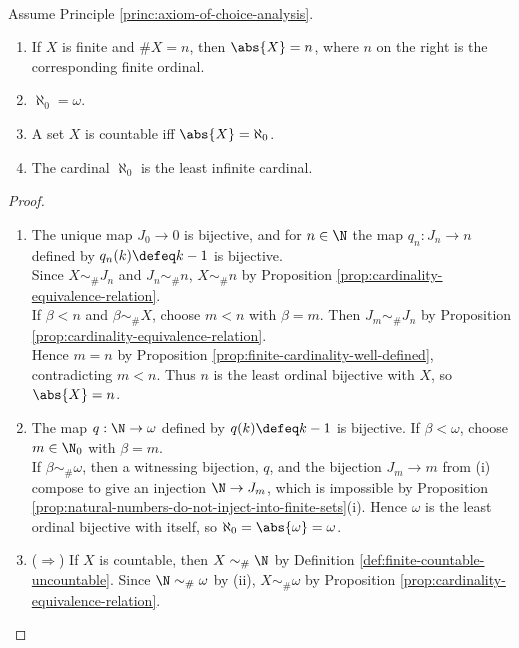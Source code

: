 \begin{proposition} \label{prop:finite-cardinality-and-aleph-zero-agreement} \\
Assume Principle \ref{princ:axiom-of-choice-analysis}.
\begin{enumerate}[label=(\roman*)]
\setlength{\itemsep}{0pt}
\item If $X$ is finite and $\#X=n$, then $\abs{X}=n$, where $n$ on the right is the corresponding finite ordinal.
\item $\aleph_0=\omega$.
\item A set $X$ is countable iff $\abs{X}=\aleph_0$.
\item The cardinal $\aleph_0$ is the least infinite cardinal.
\end{enumerate}
\begin{proof}
\begin{enumerate}[label=(\roman*)]
\setlength{\itemsep}{0pt}
\item[$(i)$] The unique map $J_0\to0$ is bijective, and for $n\in\N$ the map $q_n:J_n\to n$ defined by $q_n(k)\defeq k-1$ is bijective.\\
Since $X\sim_{\#}J_n$ and $J_n\sim_{\#}n$, $X\sim_{\#}n$ by Proposition \ref{prop:cardinality-equivalence-relation}.\\
If $\beta<n$ and $\beta\sim_{\#}X$, choose $m<n$ with $\beta=m$. Then $J_m\sim_{\#}J_n$ by Proposition \ref{prop:cardinality-equivalence-relation}.\\
Hence $m=n$ by Proposition \ref{prop:finite-cardinality-well-defined}, contradicting $m<n$. Thus $n$ is the least ordinal bijective with $X$, so $\abs{X}=n$.
\item[$(ii)$] The map $q:\N\to\omega$ defined by $q(k)\defeq k-1$ is bijective. If $\beta<\omega$, choose $m\in\N_0$ with $\beta=m$.\\
If $\beta\sim_{\#}\omega$, then a witnessing bijection, $q$, and the bijection $J_m\to m$ from (i) compose to give an injection $\N\to J_m$, which is impossible by Proposition \ref{prop:natural-numbers-do-not-inject-into-finite-sets}(i). Hence $\omega$ is the least ordinal bijective with itself, so $\aleph_0=\abs{\omega}=\omega$.
\item[$(iii)$] ($\Rightarrow$) If $X$ is countable, then $X\sim_{\#}\N$ by Definition \ref{def:finite-countable-uncountable}. Since $\N\sim_{\#}\omega$ by (ii), $X\sim_{\#}\omega$ by Proposition \ref{prop:cardinality-equivalence-relation}.\\

\end{enumerate}
\end{proof}
\end{proposition}
